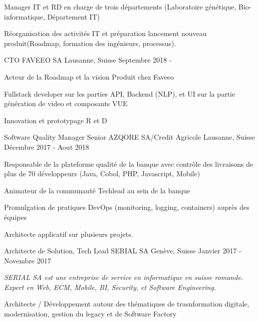 \begin{cventries}
{\begin{cvitems}
        \item{Manager IT et RD en charge de trois départements (Laboratoire génétique, Bio-informatique, Département IT)}
        \item{Réorganisation des activités IT et préparation lancement nouveau produit(Roadmap, formation des ingénieurs, processus).}
    \end{cvitems}
}
\cventry
{CTO} %
{FAVEEO SA} %
{Lausanne, Suisse} %
{Septembre 2018 - } %
{
    \begin{cvitems} %
        \item {Acteur de la Roadmap et la vision Produit chez Faveeo}
        \item {Fullstack developer sur les parties API, Backend (NLP), et UI sur la partie génération de video et composants VUE}
        \item {Innovation et prototypage R et D}        
    \end{cvitems}
}%
\cventry
{Software Quality Manager Senior} %
{AZQORE SA/Credit Agricole} %
{Lausanne, Suisse} %
{Décembre 2017 - Aout 2018} %
{
    \begin{cvitems} %
        \item {Responsable de la plateforme qualité de la banque avec contrôle des livraisons de plus de 70 développeurs (Java, Cobol, PHP, Javascript, Mobile)}
        \item {Animateur de la communauté Techlead au sein de la banque}        
        \item {Promulgation de pratiques DevOps (monitoring, logging, containers) auprès des équipes}        
        \item {Architecte applicatif sur plusieurs projets.}                
    \end{cvitems}
}%
\cventry
{Architecte de Solution, Tech Lead} %
{SERIAL SA} %
{Genève, Suisse} %
{Janvier 2017 - Novembre 2017 } %
{
	\begin{cvitems} %
		\item {\textit{SERIAL SA est une entreprise de service en informatique en suisse romande. Expert en Web, ECM, Mobile, BI, Security, et Software Engineering.}}
		\item {Architecte / Développement autour des thématiques de trasnformation digitale, modernisation, gestion du legacy et de Software Factory}

\end{cvitems}}
\end{cventries}
